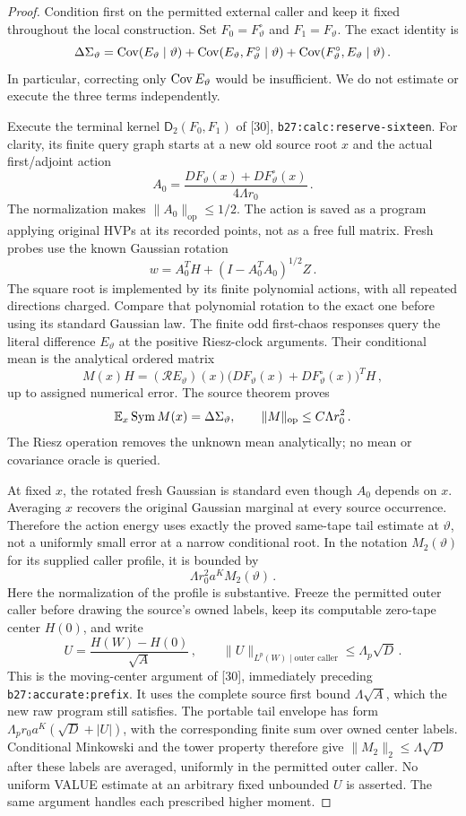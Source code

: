 \documentclass[11pt]{article}
\numberwithin{equation}{section}
\theoremstyle{remark}\newtheorem{remark}[theorem]{Remark}
\newcommand{\Sym}{\operatorname{Sym}}\newcommand{\HS}{\mathrm{HS}}
\newcommand{\op}{\mathrm{op}}\newcommand{\LL}{\Lambda}
\newcommand{\norm}[1]{\lVert#1\rVert}
\newcommand{\src}[1]{\texttt{\nolinkurl{#1}}}
\begin{document}
\begin{proof}
Condition first on the permitted external caller and keep it fixed
throughout the local construction. Set $F_0=F^\circ_\vartheta$ and
$F_1=F_\vartheta$. The exact identity is
\begin{equation}\label{eq:entire-tail-identity}
 \Delta\Sigma_\vartheta
 =\operatorname{Cov}(E_\vartheta\mid\vartheta)
    +\operatorname{Cov}(E_\vartheta,F^\circ_\vartheta\mid\vartheta)
    +\operatorname{Cov}(F^\circ_\vartheta,E_\vartheta\mid\vartheta)\,.
\end{equation}
In particular, correcting only $\operatorname{Cov} E_\vartheta$ would be insufficient.
We do not estimate or execute the three terms independently.

Execute the terminal kernel $\mathsf D_2(F_0,F_1)$ of [30],
\src{b27:calc:reserve-sixteen}. For clarity, its finite query graph
starts at a new old source root $x$ and the actual first/adjoint
action
\[
 A_0=\frac{DF_\vartheta(x)+DF^\circ_\vartheta(x)}{4\LL r_0}\,.
\]
The normalization makes $\norm{A_0}_{\op}\le1/2$.
The action is saved as a program applying original HVPs at its
recorded points, not as a free full matrix. Fresh probes use the
known Gaussian rotation
\[
 w=A_0^TH+(I-A_0^TA_0)^{1/2}Z\,.
\]
The square root is implemented by its finite polynomial actions,
with all repeated directions charged. Compare that polynomial
rotation to the exact one before using its standard Gaussian law.
The finite odd first-chaos responses query the literal difference
$E_\vartheta$ at the positive Riesz-clock arguments. Their conditional
mean is the analytical ordered matrix
\[
 M(x)H=(\mathcal R E_\vartheta)(x)
       \bigl(DF_\vartheta(x)+DF^\circ_\vartheta(x)\bigr)^T H\,,
\]
up to assigned numerical error. The source theorem proves
\[
 \E_x\Sym M(x)=\Delta\Sigma_\vartheta,\qquad
 \norm M_{\op}\le C\LL r_0^2\,.
\]
The Riesz operation removes the unknown mean analytically; no mean
or covariance oracle is queried.

At fixed $x$, the rotated fresh Gaussian is standard even though
$A_0$ depends on $x$. Averaging $x$ recovers the original Gaussian
marginal at every source occurrence. Therefore the action energy
uses exactly the proved same-tape tail estimate at $\vartheta$,
not a uniformly small error at a narrow conditional root. In the
notation $M_2(\vartheta)$ for its supplied caller profile, it is
bounded by
\[
 \LL r_0^2a^K M_2(\vartheta)\,.
\]
Here the normalization of the profile is substantive. Freeze the
permitted outer caller before drawing the source's owned labels,
keep its computable zero-tape center $H(0)$, and write
\[
 U=\frac{H(W)-H(0)}{\sqrt A}\,,\qquad
 \norm U_{L^p(W)\mid\text{outer caller}}\le\LL_p\sqrt D\,.
\]
This is the moving-center argument of [30], immediately preceding
\src{b27:accurate:prefix}. It uses the complete source first bound
$\LL\sqrt A$, which the new raw program still satisfies.
The portable tail envelope has form
$\LL_p r_0a^K(\sqrt D+|U|)$, with the corresponding finite sum
over owned center labels. Conditional Minkowski and the tower
property therefore give $\norm{M_2}_2\le\LL\sqrt D$ after
these labels are averaged, uniformly in the permitted outer caller.
No uniform VALUE estimate at an arbitrary fixed unbounded $U$ is
asserted. The same argument handles each prescribed higher moment.


\end{proof}
\end{document}
